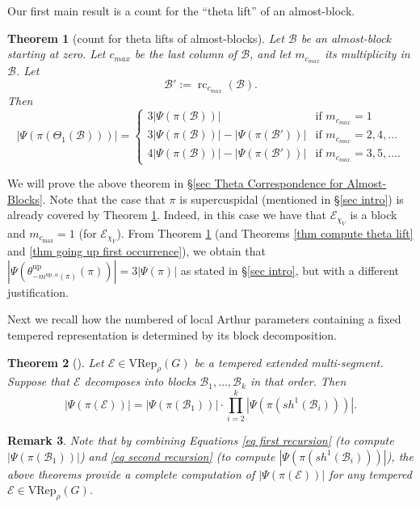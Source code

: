 \documentclass[11pt,letterpaper]{amsart}
\newcommand{\VRep}{{\mathrm{VRep}}}
\newcommand{\up}{{\mathrm{up}}}
\newcommand{\BB}{\mathcal{B}}
\newcommand{\EE}{\mathcal{E}}
\newcommand{\rc}{\operatorname{rc}}
\newtheorem{thm}{Theorem}[section]
\newtheorem{rmk}[thm]{Remark}
\numberwithin{equation}{section}
\begin{document}
Our first main result is a count for the ``theta lift'' of an almost-block.

\begin{thm}[count for theta lifts of almost-blocks]
\label{thm-count-block-theta-temp}
    Let $\BB$ be an almost-block starting at zero. Let $c_{max}$ be the last column of $\BB$, and let $m_{c_{max}}$ its multiplicity in $\mathcal{B}$. Let \[\BB' := \rc_{c_{max}}(\BB).\] Then 
    \[|\Psi(\pi(\Theta_1(\mathcal{B})))| = \begin{cases} 3 |\Psi(\pi(\mathcal{B}))| & \text{if } m_{c_{max}} = 1 \\ 3 |\Psi(\pi(\mathcal{B}))| - |\Psi(\pi(\mathcal{B}'))| & \text{if } m_{c_{max}} = 2, 4, \dots \\ 4 |\Psi(\pi(\mathcal{B}))| - |\Psi(\pi(\mathcal{B}'))| & \text{if } m_{c_{max}} = 3, 5, \dots. \end{cases}\]
\end{thm}

We will prove the above theorem in \S\ref{sec Theta Correspondence for Almost-Blocks}. Note that the case that $\pi$ is supercuspidal (mentioned in \S\ref{sec intro}) is already covered by Theorem \ref{thm-count-block-theta-temp}. Indeed, in this case we have that $\EE_{\chi_V}$ is a block and $m_{c_{\max}}=1$ (for $\EE_{\chi_V}$). From Theorem \ref{thm-count-block-theta-temp} (and Theorems \ref{thm compute theta lift} and \ref{thm going up first occurrence}), we obtain that $|\Psi(\theta_{-m^{\up,\alpha}(\pi)}^\up(\pi))|=3|\Psi(\pi)|$ as stated in \S\ref{sec intro}, but with a different justification.


Next we recall how the numbered of local Arthur parameters containing a fixed tempered representation is determined by its block decomposition.

\begin{thm}[{\cite[Theorem 3.7]{HKT26}}]
\label{thm-count-temp}
    Let $\EE\in\VRep_\rho(G)$ be a tempered extended multi-segment. Suppose that $\EE$ decomposes into blocks $\mathcal{B}_1, \dots, \mathcal{B}_k$ in that order. Then \[|\Psi(\pi(\EE))| = |\Psi(\pi(\BB_1))| \cdot \prod_{i=2}^k |\Psi(\pi(sh^1(\BB_i)))|.\]
\end{thm}




\begin{rmk}
    Note that by combining Equations \eqref{eq first recursion} (to compute $|\Psi(\pi(\BB_1))|$) and \eqref{eq second recursion}  (to compute $|\Psi(\pi(sh^1(\BB_i)))|$), the above theorems provide a complete computation of $|\Psi(\pi(\EE))|$ for any tempered $\EE\in\VRep_\rho(G)$.
\end{rmk}
\end{document}
